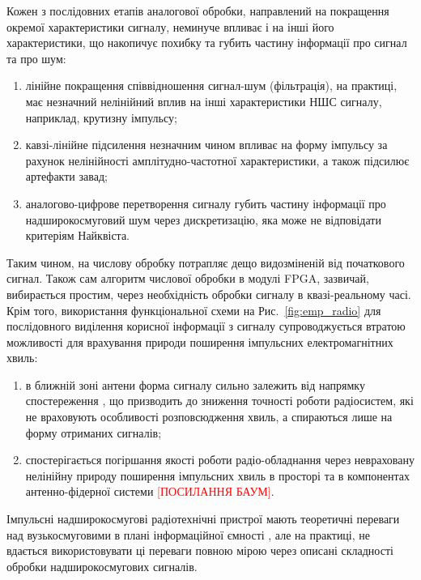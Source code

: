 Кожен з послідовних етапів аналогової обробки, направлений на покращення 
окремої характеристики сигналу, неминуче впливає і на інші його характеристики,
що накопичує похибку та губить частину інформації про сигнал та про шум:

\begin{enumerate}
	\item лінійне покращення співвідношення сигнал-шум (фільтрація), 
	на практиці, має незначний нелінійний вплив на інші характеристики НШС 
	сигналу, наприклад, крутизну імпульсу;
	\item кавзі-лінійне підсилення незначним чином впливає на 
	форму імпульсу за рахунок нелінійності амплітудно-частотної 
	характеристики, а також підсилює артефакти завад;
	\item аналогово-цифрове перетворення сигналу губить частину інформації 
	про надширокосмуговий шум через дискретизацію, яка може не відповідати критеріям Найквіста.
\end{enumerate}

Таким чином, на числову обробку потрапляє дещо видозміненій від початкового
сигнал. Також сам алгоритм числової обробки в модулі FPGA, зазвичай,
вибирається простим, через необхідність обробки сигналу в квазі-реальному 
часі. Крім того, використання функціональної схеми на Рис.~\ref{fig:emp_radio} 
для послідовного виділення корисної інформації з сигналу супроводжується
втратою можливості для врахування природи поширення імпульсних 
електромагнітних хвиль:

\begin{enumerate}
	\item в ближній зоні антени форма сигналу сильно залежить від 
	напрямку спостереження \cite{imp:Wu1985, imp:Sodin1992-10, 
	my:Telecom2018}, що призводить до зниження точності роботи радіосистем, 
	які не враховують особливості розповсюдження хвиль, а спираються лише на 
	форму отриманих сигналів;
	\item спостерігається погіршання якості роботи радіо-обладнання через 
	невраховану нелінійну природу поширення імпульсних хвиль в просторі та в 
	компонентах антенно-фідерної системи \textcolor{red}{[ПОСИЛАННЯ БАУМ]}.
\end{enumerate}

Імпульсні надширокосмугові радіотехнічні пристрої мають теоретичні 
переваги над вузькосмуговими в плані інформаційної ємності 
\cite{imp:ChannelLimitations}, але на практиці, не вдається використовувати 
ці переваги повною мірою через описані складності обробки надширокосмугових 
сигналів.

